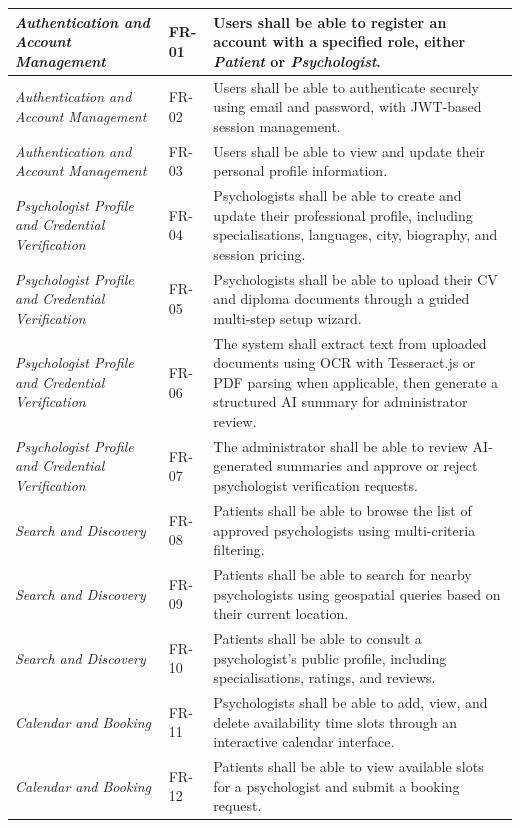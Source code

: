 \documentclass[a4paper,12pt]{report}
\begin{document}
\begin{longtable}{@{} L{0.24\textwidth} L{0.14\textwidth} L{0.54\textwidth} @{}}
\emph{Authentication and Account Management} & FR-01 & Users shall be able to register an account with a specified role, either \textit{Patient} or \textit{Psychologist}. \\
\midrule
\emph{Authentication and Account Management} & FR-02 & Users shall be able to authenticate securely using email and password, with JWT-based session management. \\
\midrule
\emph{Authentication and Account Management} & FR-03 & Users shall be able to view and update their personal profile information. \\
\midrule
\emph{Psychologist Profile and Credential Verification} & FR-04 & Psychologists shall be able to create and update their professional profile, including specialisations, languages, city, biography, and session pricing. \\
\midrule
\emph{Psychologist Profile and Credential Verification} & FR-05 & Psychologists shall be able to upload their CV and diploma documents through a guided multi-step setup wizard. \\
\midrule
\emph{Psychologist Profile and Credential Verification} & FR-06 & The system shall extract text from uploaded documents using OCR with Tesseract.js or PDF parsing when applicable, then generate a structured AI summary for administrator review. \\
\midrule
\emph{Psychologist Profile and Credential Verification} & FR-07 & The administrator shall be able to review AI-generated summaries and approve or reject psychologist verification requests. \\
\midrule
\emph{Search and Discovery} & FR-08 & Patients shall be able to browse the list of approved psychologists using multi-criteria filtering. \\
\midrule
\emph{Search and Discovery} & FR-09 & Patients shall be able to search for nearby psychologists using geospatial queries based on their current location. \\
\midrule
\emph{Search and Discovery} & FR-10 & Patients shall be able to consult a psychologist's public profile, including specialisations, ratings, and reviews. \\
\midrule
\emph{Calendar and Booking} & FR-11 & Psychologists shall be able to add, view, and delete availability time slots through an interactive calendar interface. \\
\midrule
\emph{Calendar and Booking} & FR-12 & Patients shall be able to view available slots for a psychologist and submit a booking request. \\

\end{longtable}
\end{document}
